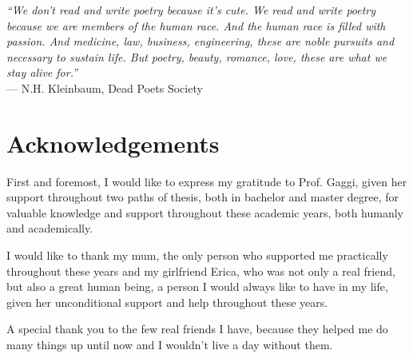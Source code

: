 \cleardoublepage
{}
{}

\begin{flushright}{
    \slshape
    ``We don't read and write poetry because it's cute. We read and write poetry because we are members of the human race. And the human race is filled with passion. And medicine, law, business, engineering, these are noble pursuits and necessary to sustain life. But poetry, beauty, romance, love, these are what we stay alive for.''} \\
    \medskip
    --- N.H. Kleinbaum, Dead Poets Society
\end{flushright}

\begingroup
\let\clearpage\relax
\let\cleardoublepage\relax
\let\cleardoublepage\relax

\chapter*{Acknowledgements}

\noindent First and foremost, I would like to express my gratitude to Prof. Gaggi, given her support throughout two paths of thesis, both in bachelor and master degree, for valuable knowledge and support throughout these academic years, both humanly and academically. 

\vspace{0.35cm}

\noindent I would like to thank my mum, the only person who supported me practically throughout these years and my girlfriend Erica, who was not only a real friend, but also a great human being, a person I would always like to have in my life, given her unconditional support and help throughout these years.

\vspace{0.35cm}

\noindent A special thank you to the few real friends I have, because they helped me do many things up until now and I wouldn't live a day without them.

\vspace{0.75cm}

\noindent{\myLocation, \myTime}
\hfill \textit{\myName}

\endgroup
